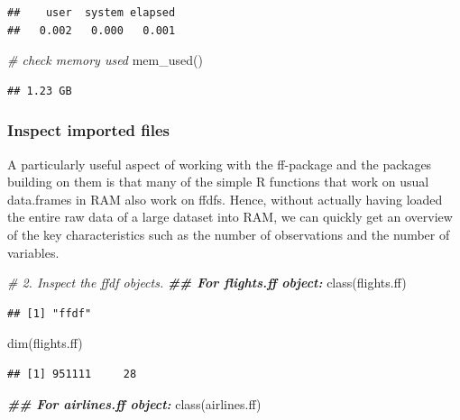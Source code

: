 \documentclass[
  12pt,
]{style/krantz}
\newenvironment{Shaded}{\begin{snugshade}}{\end{snugshade}}
\newcommand{\CommentTok}[1]{\textcolor[rgb]{0.56,0.35,0.01}{\textit{#1}}}
\newcommand{\DocumentationTok}[1]{\textcolor[rgb]{0.56,0.35,0.01}{\textbf{\textit{#1}}}}
\newcommand{\FunctionTok}[1]{\textcolor[rgb]{0.00,0.00,0.00}{#1}}
\newcommand{\NormalTok}[1]{#1}
\begin{document}
\begin{verbatim}
##    user  system elapsed 
##   0.002   0.000   0.001
\end{verbatim}

\begin{Shaded}
\begin{Highlighting}[]
\CommentTok{\# check memory used}
\FunctionTok{mem\_used}\NormalTok{()}
\end{Highlighting}
\end{Shaded}

\begin{verbatim}
## 1.23 GB
\end{verbatim}

\hypertarget{inspect-imported-files}{%
\subsubsection{Inspect imported files}\label{inspect-imported-files}}

A particularly useful aspect of working with the ff-package and the packages building on them is that many of the simple R functions that work on usual data.frames in RAM also work on ffdfs. Hence, without actually having loaded the entire raw data of a large dataset into RAM, we can quickly get an overview of the key characteristics such as the number of observations and the number of variables.

\begin{Shaded}
\begin{Highlighting}[]
\CommentTok{\# 2. Inspect the ffdf objects.}
\DocumentationTok{\#\# For flights.ff object:}
\FunctionTok{class}\NormalTok{(flights.ff)}
\end{Highlighting}
\end{Shaded}

\begin{verbatim}
## [1] "ffdf"
\end{verbatim}

\begin{Shaded}
\begin{Highlighting}[]
\FunctionTok{dim}\NormalTok{(flights.ff)}
\end{Highlighting}
\end{Shaded}

\begin{verbatim}
## [1] 951111     28
\end{verbatim}

\begin{Shaded}
\begin{Highlighting}[]
\DocumentationTok{\#\# For airlines.ff object:}
\FunctionTok{class}\NormalTok{(airlines.ff)}
\end{Highlighting}
\end{Shaded}
\end{document}
